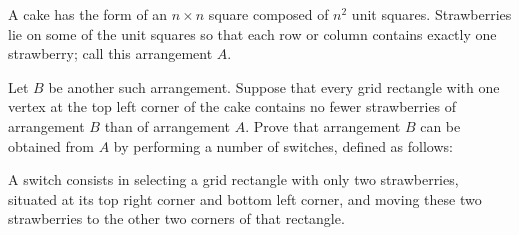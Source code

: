 A cake has the form of an $n \times n$ square composed of $n^2$ unit squares. Strawberries lie on some of the unit squares so that each row or column contains exactly one strawberry; call this arrangement $A$.

Let $B$ be another such arrangement. Suppose that every grid rectangle with one vertex at the top left corner of the cake contains no fewer strawberries of arrangement $B$ than of arrangement $A$. Prove that arrangement $B$ can be obtained from $A$ by performing a number of switches, defined as follows:

A switch consists in selecting a grid rectangle with only two strawberries, situated at its top right corner and bottom left corner, and moving these two strawberries to the other two corners of that rectangle.
